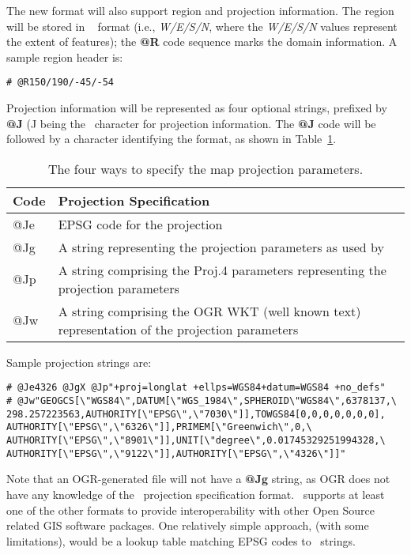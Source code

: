 The new format will also support region and projection information. The
region will be stored in \GMT\  format (i.e., \emph{W/E/S/N},
where the \emph{W/E/S/N} values represent the extent of features); the
\textbf{@R} code sequence marks the domain information.
A sample region header is:

\begin{verbatim}
# @R150/190/-45/-54
\end{verbatim}

Projection information will be represented as four optional strings,
prefixed by \textbf{@J} (J being the \GMT\ character for projection information.
The \textbf{@J} code will be followed by a character identifying the format, as shown
in Table~\ref{tbl:projectspec}.

\begin{table}[H]
\small
\centering
\begin{tabular}{ll}  \hline
\textbf{Code}	&	\textbf{Projection Specification} \\ \hline \hline
@Je	&	EPSG code for the projection \\
@Jg	&	A string representing the projection parameters as used by \GMT\ \\
@Jp	&	A string comprising the Proj.4 parameters representing the projection parameters \\
@Jw	&	A string comprising the OGR WKT (well known text) representation of the projection parameters \\ \hline
\end{tabular}
\label{tbl:projectspec}
\caption{The four ways to specify the map projection parameters.}
\end{table} 

Sample projection strings are:

\begin{verbatim}
# @Je4326 @JgX @Jp"+proj=longlat +ellps=WGS84+datum=WGS84 +no_defs"
# @Jw"GEOGCS[\"WGS84\",DATUM[\"WGS_1984\",SPHEROID\"WGS84\",6378137,\
298.257223563,AUTHORITY[\"EPSG\",\"7030\"]],TOWGS84[0,0,0,0,0,0,0],
AUTHORITY[\"EPSG\",\"6326\"]],PRIMEM[\"Greenwich\",0,\
AUTHORITY[\"EPSG\",\"8901\"]],UNIT[\"degree\",0.01745329251994328,\
AUTHORITY[\"EPSG\",\"9122\"]],AUTHORITY[\"EPSG\",\"4326\"]]"
\end{verbatim}

Note that an OGR-generated file will not have a \textbf{@Jg} string, as OGR does
not have any knowledge of the \GMT\ projection specification format. 
\GMT\ supports at least one of the other formats to provide interoperability with other Open Source
related GIS software packages. One relatively simple approach, (with
some limitations), would be a lookup table matching EPSG codes to \GMT\ strings. 

